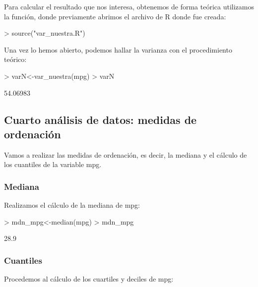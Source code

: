 \documentclass [a4paper] {article}
\begin{document}
Para calcular el resultado que nos interesa, obtenemos de forma teórica utilizamos 
la función, donde previamente abrimos el archivo de R donde fue creada:

\begin{Schunk}
\begin{Sinput}
> source("var_nuestra.R")
\end{Sinput}
\end{Schunk}

Una vez lo hemos abierto, podemos hallar la varianza con el procedimiento teórico:

\begin{Schunk}
\begin{Sinput}
> varN<-var_nuestra(mpg)
> varN
\end{Sinput}
\begin{Soutput}
[1] 54.06983
\end{Soutput}
\end{Schunk}

\subsection{Cuarto análisis de datos: medidas de ordenación}
Vamos a realizar las medidas de ordenación, es decir, la mediana y el cálculo de los cuantiles de la variable mpg.

\subsubsection{Mediana}
Realizamos el cálculo de la mediana de mpg:

\begin{Schunk}
\begin{Sinput}
> mdn_mpg<-median(mpg)
> mdn_mpg
\end{Sinput}
\begin{Soutput}
[1] 28.9
\end{Soutput}
\end{Schunk}

\subsubsection{Cuantiles}
Procedemos al cálculo de los cuartiles y deciles de mpg:
\end{document}
